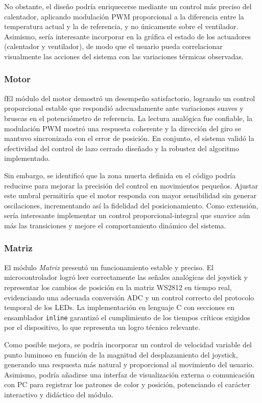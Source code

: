No obstante, el diseño podría enriquecerse mediante un control más preciso del calentador, aplicando modulación PWM proporcional a la diferencia entre la temperatura actual y la de referencia, y no únicamente sobre el ventilador. Asimismo, sería interesante incorporar en la gráfica el estado de los actuadores (calentador y ventilador), de modo que el usuario pueda correlacionar visualmente las acciones del sistema con las variaciones térmicas observadas.

\subsubsection{Motor}

fEl módulo del motor demostró un desempeño satisfactorio, logrando un control proporcional estable que respondió adecuadamente ante variaciones suaves y bruscas en el potenciómetro de referencia. La lectura analógica fue confiable, la modulación PWM mostró una respuesta coherente y la dirección del giro se mantuvo sincronizada con el error de posición. En conjunto, el sistema validó la efectividad del control de lazo cerrado diseñado y la robustez del algoritmo implementado.

Sin embargo, se identificó que la zona muerta definida en el código podría reducirse para mejorar la precisión del control en movimientos pequeños. Ajustar este umbral permitiría que el motor responda con mayor sensibilidad sin generar oscilaciones, incrementando así la fidelidad del posicionamiento. Como extensión, sería interesante implementar un control proporcional-integral que suavice aún más las transiciones y mejore el comportamiento dinámico del sistema.

\subsubsection{Matriz}

El módulo \textit{Matriz} presentó un funcionamiento estable y preciso. El microcontrolador logró leer correctamente las señales analógicas del joystick y representar los cambios de posición en la matriz WS2812 en tiempo real, evidenciando una adecuada conversión ADC y un control correcto del protocolo temporal de los LEDs. La implementación en lenguaje C con secciones en ensamblador \texttt{inline} garantizó el cumplimiento de los tiempos críticos exigidos por el dispositivo, lo que representa un logro técnico relevante.

Como posible mejora, se podría incorporar un control de velocidad variable del punto luminoso en función de la magnitud del desplazamiento del joystick, generando una respuesta más natural y proporcional al movimiento del usuario. Asimismo, podría añadirse una interfaz de visualización externa o comunicación con PC para registrar los patrones de color y posición, potenciando el carácter interactivo y didáctico del módulo.

